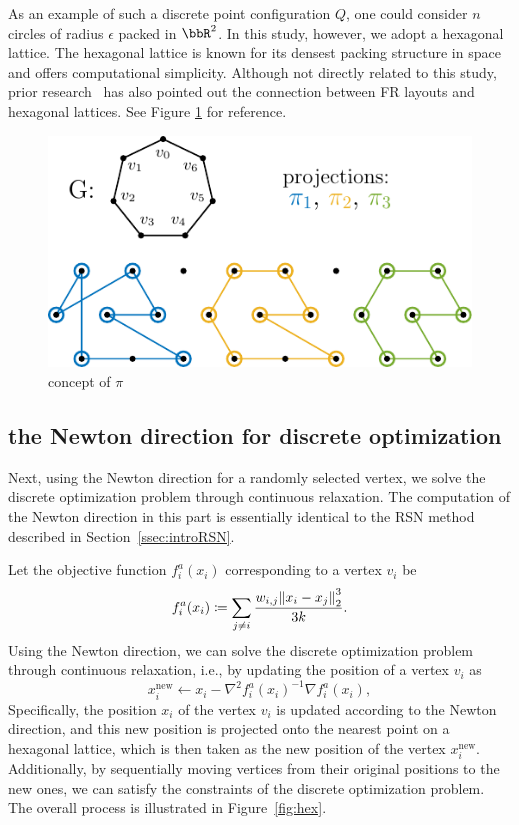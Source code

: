 \documentclass[dvipdfmx,lettersize,journal]{IEEEtran}
\newcommand{\defeq}{\coloneqq}
\begin{document}
As an example of such a discrete point configuration $Q$, one could consider $n$ circles of radius $\epsilon$ packed in $\bbR^2$.
In this study, however, we adopt a hexagonal lattice.
The hexagonal lattice is known for its densest packing structure in space and offers computational simplicity.
Although not directly related to this study, prior research~\cite{s22145179} has also pointed out the connection between FR layouts and hexagonal lattices.
See Figure \ref{fig:pi} for reference.

\begin{figure}[t]
  \centering
  \includegraphics[width=\columnwidth]{pi.pdf}
  \caption{concept of $\pi$}
  \label{fig:pi}
\end{figure}

\subsection{the Newton direction for discrete optimization}\label{ssec:newtonDirection}

Next, using the Newton direction for a randomly selected vertex, we solve the discrete optimization problem through continuous relaxation. The computation of the Newton direction in this part is essentially identical to the RSN method described in Section~\ref{ssec:introRSN}.

Let the objective function $f^a_i(x_i)$ corresponding to a vertex $v_i$ be
\begin{equation*}
  f^a_i(x_i) \defeq \sum_{j \neq i} \frac{w_{i,j}\norm{x_i - x_j}_2^3}{3k}.
\end{equation*}
Using the Newton direction, we can solve the discrete optimization problem through continuous relaxation, i.e., by updating the position of a vertex $v_i$ as
\begin{equation*}
  x_i^\mathrm{new} \gets x_i - \nabla^2 f^a_i(x_i)^{-1} \nabla f^a_i(x_i),
\end{equation*}
Specifically, the position $x_i$ of the vertex $v_i$ is updated according to the Newton direction, and this new position is projected onto the nearest point on a hexagonal lattice, which is then taken as the new position of the vertex $x_i^\mathrm{new}$.
Additionally, by sequentially moving vertices from their original positions to the new ones, we can satisfy the constraints of the discrete optimization problem. The overall process is illustrated in Figure~\ref{fig:hex}.
\end{document}
